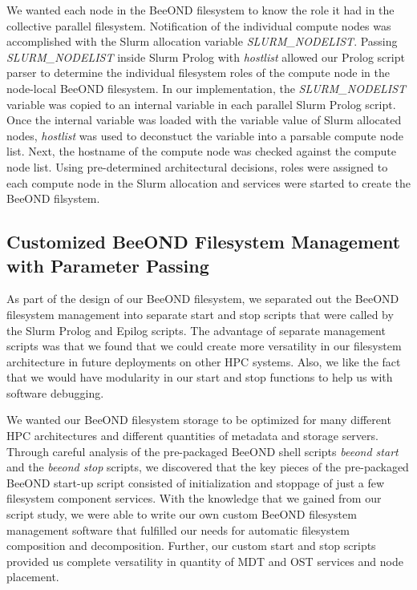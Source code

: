 We wanted each node in the BeeOND filesystem to know the role it had in the collective parallel filesystem.  Notification of the individual compute nodes was accomplished with the Slurm allocation variable \textit {SLURM\_NODELIST}. Passing \textit {SLURM\_NODELIST} inside Slurm Prolog with \textit{hostlist} allowed our Prolog script parser to determine the individual filesystem roles of the compute node in the node-local BeeOND filesystem. In our implementation, the \textit {SLURM\_NODELIST} variable was copied to an internal variable in each parallel Slurm Prolog script.  Once the internal variable was loaded with the variable value of Slurm allocated nodes, \textit {hostlist} was used to deconstuct the variable into a parsable compute node list.  Next, the hostname of the compute node was checked against the compute node list.  Using pre-determined architectural decisions, roles were assigned to each compute node in the Slurm allocation and services were started to create the BeeOND filsystem.

\subsection{Customized BeeOND Filesystem Management with Parameter Passing}

As part of the design of our BeeOND filesystem, we separated out the BeeOND filesystem management into separate start and stop scripts that were called by the Slurm Prolog and Epilog scripts.  The advantage of separate  management scripts was that we found that we could create more versatility in our filesystem architecture in future deployments on other HPC systems.  Also, we like the fact that we would have modularity in our start and stop functions to help us with software debugging.  

We wanted our BeeOND filesystem storage to be optimized for many different HPC architectures and different quantities of metadata and storage servers.  Through careful analysis of the pre-packaged BeeOND shell scripts \textit{beeond start} and the \textit{beeond stop} scripts, we discovered that the key pieces of the pre-packaged BeeOND start-up script consisted of initialization and stoppage of just a few filesystem component services.  With the knowledge that we gained from our script study, we were able to write our own custom BeeOND filesystem management software that fulfilled our needs for automatic filesystem composition and decomposition.  Further, our custom start and stop scripts provided us complete versatility in quantity of MDT and OST services and node placement.  

